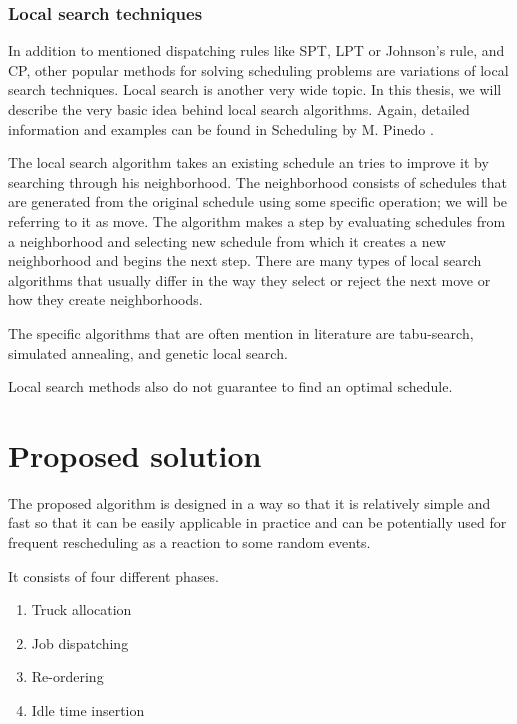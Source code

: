 \documentclass{ctuthesis}
\begin{document}
\subsection{Local search techniques}

In addition to mentioned dispatching rules like SPT, LPT or Johnson's rule, and CP, other popular methods for solving scheduling problems are variations of local search techniques. Local search is another very wide topic. In this thesis, we will describe the very basic idea behind local search algorithms. Again, detailed information and examples can be found in Scheduling by M. Pinedo \cite{pinedo}. 

The local search algorithm takes an existing schedule an tries to improve it by searching through his neighborhood. The neighborhood consists of schedules that are generated from the original schedule using some specific operation; we will be referring to it as move. The algorithm makes a step by evaluating schedules from a neighborhood and selecting new schedule from which it creates a new neighborhood and begins the next step. There are many types of local search algorithms that usually differ in the way they select or reject the next move or how they create neighborhoods. 

The specific algorithms that are often mention in literature are tabu-search, simulated annealing, and genetic local search.


Local search methods also do not guarantee to find an optimal schedule.

\chapter{Proposed solution}
\label{ch:Proposed solution}

The proposed algorithm is designed in a way so that it is relatively simple and fast so that it can be easily applicable in practice and can be potentially used for frequent rescheduling as a reaction to some random events.

It consists of four different phases.

\begin{enumerate}
    \item Truck allocation
    \item Job dispatching
    \item Re-ordering
    \item Idle time insertion
\end{enumerate}
\end{document}
